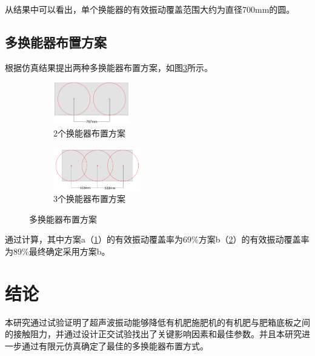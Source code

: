 \documentclass[fontset=windows,12pt,a4paper]{ctexart}
\begin{document}
从结果中可以看出，单个换能器的有效振动覆盖范围大约为直径700mm的圆。

\subsection{多换能器布置方案}

根据仿真结果提出两种多换能器布置方案，如图\ref{pic:多换能器布置方案}所示。

\begin{figure}[h]
  \centering
  \begin{subfigure}{0.4\textwidth}
    \centering
    \includegraphics[height=5em]{assets/2transducer.pdf}
    \caption{2个换能器布置方案}
    \label{pic:2个换能器布置方案}
  \end{subfigure}
  \hfill
  \begin{subfigure}{0.5\textwidth}
    \centering
    \includegraphics[height=5em]{assets/3transducer.pdf}
    \caption{3个换能器布置方案}
    \label{pic:3个换能器布置方案}
  \end{subfigure}
  \caption{多换能器布置方案}
  \label{pic:多换能器布置方案}
\end{figure}

通过计算，其中方案a（\ref{pic:2个换能器布置方案}）的有效振动覆盖率为69\%方案b（\ref{pic:3个换能器布置方案}）的有效振动覆盖率为89\%最终确定采用方案b。

\section{结论}

本研究通过试验证明了超声波振动能够降低有机肥施肥机的有机肥与肥箱底板之间的接触阻力，并通过设计正交试验找出了关键影响因素和最佳参数。并且本研究进一步通过有限元仿真确定了最佳的多换能器布置方式。
\end{document}

